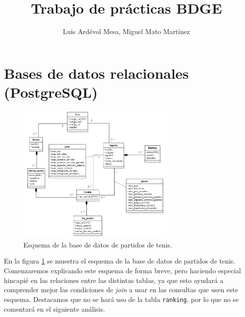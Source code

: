 \documentclass[11pt]{opticajnl}
\title{Trabajo de prácticas BDGE}
\author[1,2,3]{Luis Ardévol Mesa, Miguel Mato Martínez}
\begin{document}
\maketitle

\section{Bases de datos relacionales (PostgreSQL)}

\begin{figure}[H]
  \centering
  \includegraphics[width=0.7\textwidth]{fotos/esquema.png}
  \caption{Esquema de la base de datos de partidos de tenis.}
  \label{fig:schbd}
\end{figure}

En la figura \ref{fig:schbd} se muestra el esquema de la base de datos de partidos de tenis. Comenzaremos explicando este esquema de forma breve, pero haciendo especial hincapié en las relaciones entre las distintas tablas, ya que esto ayudará a comprender mejor las condiciones de \textit{join} a usar en las consultas que usen este esquema. Destacamos que no se hará uso de la tabla \texttt{ranking}, por lo que no se comentará en el siguiente análisis. \\
\end{document}
